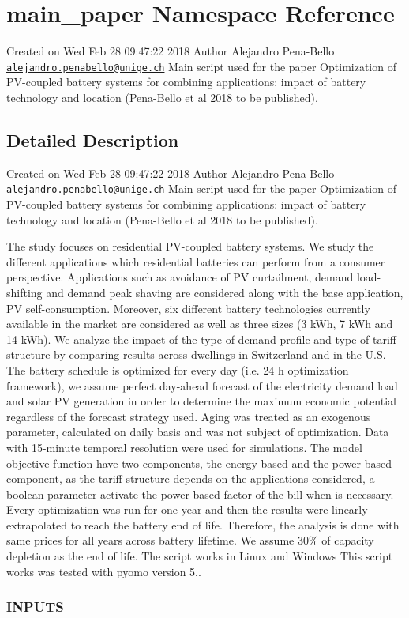 \hypertarget{namespacemain__paper}{}\section{main\+\_\+paper Namespace Reference}
\label{namespacemain__paper}


Created on Wed Feb 28 09\+:47\+:22 2018 Author Alejandro Pena-\/\+Bello \href{mailto:alejandro.penabello@unige.ch}{\tt alejandro.\+penabello@unige.\+ch} Main script used for the paper Optimization of P\+V-\/coupled battery systems for combining applications\+: impact of battery technology and location (Pena-\/\+Bello et al 2018 to be published).  




\subsection{Detailed Description}
Created on Wed Feb 28 09\+:47\+:22 2018 Author Alejandro Pena-\/\+Bello \href{mailto:alejandro.penabello@unige.ch}{\tt alejandro.\+penabello@unige.\+ch} Main script used for the paper Optimization of P\+V-\/coupled battery systems for combining applications\+: impact of battery technology and location (Pena-\/\+Bello et al 2018 to be published). 

The study focuses on residential P\+V-\/coupled battery systems. We study the different applications which residential batteries can perform from a consumer perspective. Applications such as avoidance of PV curtailment, demand load-\/shifting and demand peak shaving are considered along with the base application, PV self-\/consumption. Moreover, six different battery technologies currently available in the market are considered as well as three sizes (3 k\+Wh, 7 k\+Wh and 14 k\+Wh). We analyze the impact of the type of demand profile and type of tariff structure by comparing results across dwellings in Switzerland and in the U.\+S. The battery schedule is optimized for every day (i.\+e. 24 h optimization framework), we assume perfect day-\/ahead forecast of the electricity demand load and solar PV generation in order to determine the maximum economic potential regardless of the forecast strategy used. Aging was treated as an exogenous parameter, calculated on daily basis and was not subject of optimization. Data with 15-\/minute temporal resolution were used for simulations. The model objective function have two components, the energy-\/based and the power-\/based component, as the tariff structure depends on the applications considered, a boolean parameter activate the power-\/based factor of the bill when is necessary. Every optimization was run for one year and then the results were linearly-\/extrapolated to reach the battery end of life. Therefore, the analysis is done with same prices for all years across battery lifetime. We assume 30\% of capacity depletion as the end of life. The script works in Linux and Windows This script works was tested with pyomo version 5.. \subsubsection*{I\+N\+P\+U\+TS }

